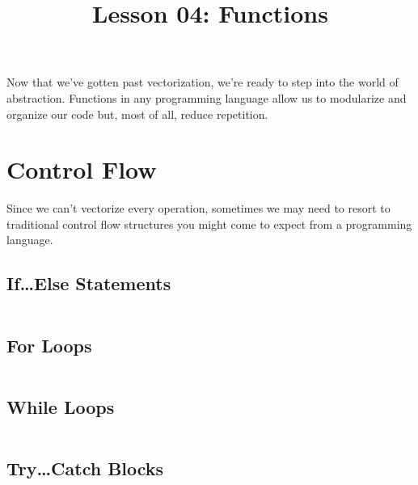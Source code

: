 \documentclass{article}
\title{Lesson 04: Functions}
\begin{document}
\renderTitle

Now that we've gotten past vectorization, we're ready to step into the
world of abstraction.  Functions in any programming language allow us to
modularize and organize our code but, most of all, reduce repetition.

\section{Control Flow}

Since we can't vectorize every operation, sometimes we may need to
resort to traditional control flow structures you might come to expect
from a programming language.

\subsection{If\dots Else Statements}

\inputminted{matlab}{04-functions.d/if-else.m}

\subsection{For Loops}

\inputminted{matlab}{04-functions.d/for.m}

\subsection{While Loops}

\inputminted{matlab}{04-functions.d/while.m}

\subsection{Try\dots Catch Blocks}

\inputminted{matlab}{04-functions.d/try-catch.m}
\end{document}
